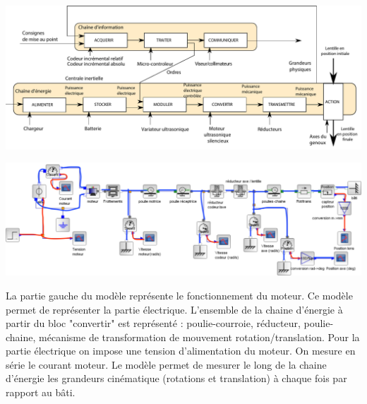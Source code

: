 \ifprof
\begin{corrige}
\begin{center}
\includegraphics[width=1.0\textwidth]{images/chaine_fonctionnelle_corrige.pdf}
\end{center}
\end{corrige}
\else
\fi


\ifprof
\begin{corrige}
\begin{center}
\includegraphics[width=1.0\textwidth]{images/image13_corrige.png}
\end{center}
\end{corrige}
\else
\fi



\ifprof
\begin{corrige}
La partie gauche du modèle représente le fonctionnement du moteur. Ce modèle permet de représenter la partie électrique. L'ensemble de la chaine d'énergie à partir du bloc "convertir" est représenté : poulie-courroie, réducteur, poulie-chaine, mécanisme de transformation de mouvement rotation/translation. Pour la partie électrique on impose une tension d'alimentation du moteur. On mesure en série le courant moteur. Le modèle permet de mesurer le long de la chaine d'énergie les grandeurs cinématique (rotations et translation) à chaque fois par rapport au bâti.
\end{corrige}
\else
\fi


